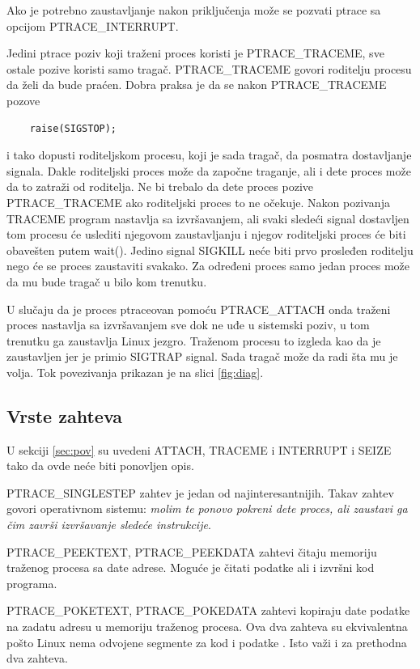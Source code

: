 \documentclass[a4paper]{article}
\begin{document}
Ako je potrebno zaustavljanje nakon priključenja može se pozvati ptrace sa opcijom PTRACE\_INTERRUPT.

Jedini ptrace poziv koji traženi proces koristi je PTRACE\_TRACEME, sve ostale pozive koristi samo tragač.
PTRACE\_TRACEME govori roditelju procesu da želi da bude praćen. 
Dobra praksa je da se nakon PTRACE\_TRACEME pozove 

\begin{verbatim}
    raise(SIGSTOP);
\end{verbatim}
i tako dopusti roditeljskom procesu, koji je sada tragač, da posmatra dostavljanje signala.
Dakle roditeljski proces može da započne traganje, ali i dete proces može da to zatraži od roditelja.
Ne bi trebalo da dete proces pozive PTRACE\_TRACEME ako roditeljski proces to ne očekuje. 
Nakon pozivanja TRACEME program nastavlja sa izvršavanjem, ali svaki sledeći signal dostavljen tom procesu
će uslediti njegovom zaustavljanju i njegov roditeljski proces će biti obavešten putem wait(). 
Jedino signal SIGKILL neće biti prvo prosleđen roditelju nego će se proces zaustaviti svakako.
Za određeni proces samo jedan proces može da mu bude tragač u bilo kom trenutku.

U slučaju da je proces ptraceovan pomoću PTRACE\_ATTACH onda traženi proces nastavlja sa izvršavanjem sve dok ne
uđe u sistemski poziv, u tom trenutku ga zaustavlja Linux jezgro. Traženom procesu to izgleda kao da je zaustavljen
jer je primio SIGTRAP signal. Sada tragač može da radi šta mu je volja. Tok povezivanja prikazan je na slici \ref{fig:diag}.

\subsection{Vrste zahteva}	
U sekciji \ref{sec:pov} su uvedeni 
ATTACH, TRACEME i INTERRUPT i SEIZE tako da ovde neće biti ponovljen opis.

PTRACE\_SINGLESTEP
    zahtev je jedan od najinteresantnijih. Takav zahtev govori operativnom sistemu: \emph{molim te ponovo pokreni
    dete proces, ali zaustavi ga čim završi izvršavanje sledeće instrukcije}.

PTRACE\_PEEKTEXT, PTRACE\_PEEKDATA
    zahtevi čitaju memoriju traženog procesa sa date adrese. Moguće je čitati podatke ali i izvršni kod programa.

PTRACE\_POKETEXT, PTRACE\_POKEDATA
    zahtevi kopiraju date podatke na zadatu adresu u memoriju traženog procesa.
    Ova dva zahteva su ekvivalentna pošto Linux nema odvojene segmente za kod i podatke \cite{man}. 
    Isto važi i za prethodna dva zahteva.
\end{document}
